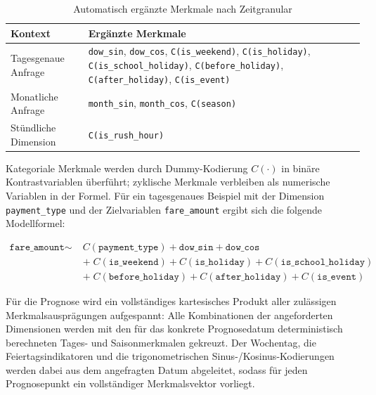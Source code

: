 \begin{table}[htb]
\centering
\caption[Merkmale nach Zeitgranular]{Automatisch ergänzte Merkmale nach Zeitgranular\footnotemark}
\label{tab:features}
\begin{tabular}{lp{9cm}}
\toprule
\textbf{Kontext}       & \textbf{Ergänzte Merkmale} \\
\midrule
Tagesgenaue Anfrage    & \texttt{dow\_sin}, \texttt{dow\_cos}, \texttt{C(is\_weekend)},
                         \texttt{C(is\_holiday)}, \texttt{C(is\_school\_holiday)},
                         \texttt{C(before\_holiday)}, \texttt{C(after\_holiday)},
                         \texttt{C(is\_event)} \\[4pt]
Monatliche Anfrage     & \texttt{month\_sin}, \texttt{month\_cos}, \texttt{C(season)} \\[4pt]
Stündliche Dimension   & \texttt{C(is\_rush\_hour)} \\
\bottomrule
\end{tabular}
\end{table}

Kategoriale Merkmale werden durch Dummy-Kodierung $C(\cdot)$ in binäre Kontrastvariablen überführt; zyklische Merkmale verbleiben als numerische Variablen in der Formel. Für ein tagesgenaues Beispiel mit der Dimension \texttt{payment\_type} und der Zielvariablen \texttt{fare\_amount} ergibt sich die folgende Modellformel:

\begin{equation}
\begin{split}
    \texttt{fare\_amount} \sim\; & C(\texttt{payment\_type}) + \texttt{dow\_sin} + \texttt{dow\_cos} \\
    & +\; C(\texttt{is\_weekend}) + C(\texttt{is\_holiday}) + C(\texttt{is\_school\_holiday}) \\
    & +\; C(\texttt{before\_holiday}) + C(\texttt{after\_holiday}) + C(\texttt{is\_event})
\end{split}
\end{equation}

Für die Prognose wird ein vollständiges kartesisches Produkt aller zulässigen Merkmalsausprägungen aufgespannt: Alle Kombinationen der angeforderten Dimensionen werden mit den für das konkrete Prognosedatum deterministisch berechneten Tages- und Saisonmerkmalen gekreuzt. Der Wochentag, die Feiertagsindikatoren und die trigonometrischen Sinus-/Kosinus-Kodierungen werden dabei aus dem angefragten Datum abgeleitet, sodass für jeden Prognosepunkt ein vollständiger Merkmalsvektor vorliegt.

